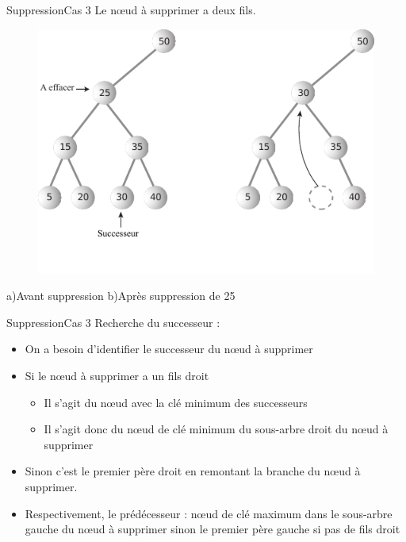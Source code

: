 \documentclass[12pt,a4paper]{beamer}
\newcommand{\hl}[1]{\textcolor{blueemph}{#1}}
\begin{document}
\begin{frame}{Suppression}{Cas 3}
Le n\oe ud à supprimer a deux fils.
\begin{figure}
\includegraphics[scale=0.8]{figs/del3_tree}
\end{figure}
\hspace{3em}a)Avant suppression \hspace{1em}  b)Après suppression de 25
\end{frame}

\begin{frame}{Suppression}{Cas 3}
Recherche du successeur :
\begin{itemize}
\item On a besoin d'identifier le \hl{successeur} du n\oe ud à supprimer
\item Si le n\oe ud à supprimer a un fils droit
\begin{itemize}
\item Il s'agit du n\oe ud avec la clé minimum des successeurs
\item Il s'agit donc du n\oe ud de clé minimum du sous-arbre droit du n\oe ud à supprimer
\end{itemize}
\item Sinon c'est le premier père droit en remontant la branche du n\oe ud à supprimer.
\item Respectivement, le \hl{prédécesseur} : n\oe ud de clé maximum dans le sous-arbre gauche du  n\oe ud à supprimer sinon le premier père gauche si pas de fils droit
\end{itemize}
\end{frame}
\end{document}
